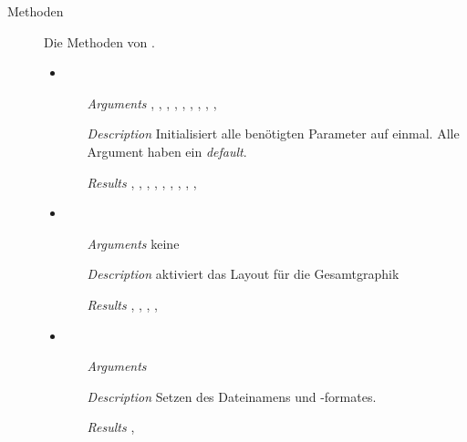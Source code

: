 \begin{description}
\begin{itemize}
\begin{enumerate}
\end{enumerate}

\end{itemize}


\newpage

\item[Methoden] Die Methoden von .
\begin{itemize}
  
\item {}
\begin{enumerate}
\item[\textit{Arguments}] ,
  , ,
  , ,
  , ,
  , ,
\item[\textit{Description}] Initialisiert alle ben\"otigten Parameter
  auf einmal. Alle Argument haben ein \textit{default}.
\item[\textit{Results}] ,
  , ,
  , ,
  , ,
  , ,


\end{enumerate}

\item {}
\begin{enumerate}
\item[\textit{Arguments}] keine
\item[\textit{Description}] aktiviert das Layout f\"ur die
  Gesamtgraphik
\item[\textit{Results}] ,
  , ,
  ,
\end{enumerate}

\item {}
\begin{enumerate}
\item[\textit{Arguments}] 
\item[\textit{Description}] Setzen des Dateinamens und -formates.
\item[\textit{Results}] ,
\end{enumerate}


\end{itemize}
\end{description}
